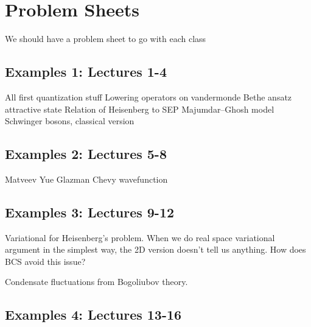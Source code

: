 \section{Problem Sheets}


We should have a problem sheet to go with each class

\subsection{Examples 1: Lectures 1-4}

All first quantization stuff
Lowering operators on vandermonde
Bethe ansatz attractive state
Relation of Heisenberg to SEP
Majumdar--Ghosh model
Schwinger bosons, classical version

\subsection{Examples 2: Lectures 5-8}

Matveev Yue Glazman
Chevy wavefunction

\subsection{Examples 3: Lectures 9-12}

Variational for Heisenberg's problem. When we do real space variational argument in the simplest way, the 2D version doesn't tell us anything. How does BCS avoid this issue?

Condensate fluctuations from Bogoliubov theory.

\subsection{Examples 4: Lectures 13-16}



